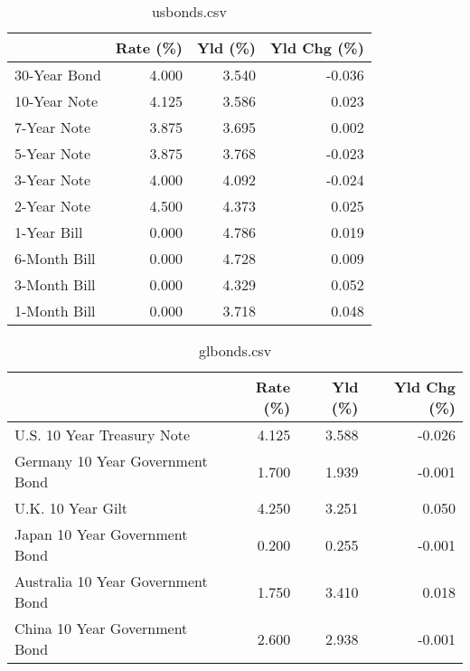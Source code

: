 \documentclass{article}%
\begin{document}
%


\begin{table}[htbp]%
\caption{usbonds.csv}%
\centering%
\begin{adjustbox}{width=1\textwidth}%
\begin{tabular}{lrrr}
\toprule
             &  Rate (\%) &  Yld (\%) &  Yld Chg (\%) \\
\midrule
30-Year Bond &     4.000 &    3.540 &       -0.036 \\
10-Year Note &     4.125 &    3.586 &        0.023 \\
 7-Year Note &     3.875 &    3.695 &        0.002 \\
 5-Year Note &     3.875 &    3.768 &       -0.023 \\
 3-Year Note &     4.000 &    4.092 &       -0.024 \\
 2-Year Note &     4.500 &    4.373 &        0.025 \\
 1-Year Bill &     0.000 &    4.786 &        0.019 \\
6-Month Bill &     0.000 &    4.728 &        0.009 \\
3-Month Bill &     0.000 &    4.329 &        0.052 \\
1-Month Bill &     0.000 &    3.718 &        0.048 \\
\bottomrule
\end{tabular}
%
\end{adjustbox}%
\end{table}

%


\begin{table}[htbp]%
\caption{glbonds.csv}%
\centering%
\begin{adjustbox}{width=1\textwidth}%
\begin{tabular}{lrrr}
\toprule
                                  &  Rate (\%) &  Yld (\%) &  Yld Chg (\%) \\
\midrule
       U.S. 10 Year Treasury Note &     4.125 &    3.588 &       -0.026 \\
  Germany 10 Year Government Bond &     1.700 &    1.939 &       -0.001 \\
                U.K. 10 Year Gilt &     4.250 &    3.251 &        0.050 \\
    Japan 10 Year Government Bond &     0.200 &    0.255 &       -0.001 \\
Australia 10 Year Government Bond &     1.750 &    3.410 &        0.018 \\
    China 10 Year Government Bond &     2.600 &    2.938 &       -0.001 \\
\bottomrule
\end{tabular}
%
\end{adjustbox}%
\end{table}
\end{document}
